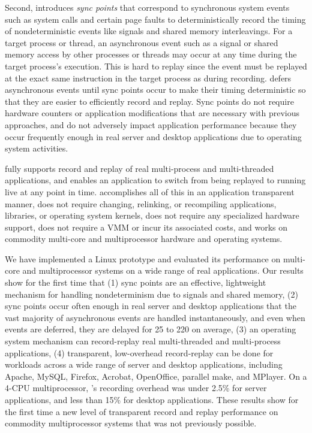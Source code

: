 Second, \scribe{} introduces {\em sync points} that correspond to
synchronous system events such as system calls and certain page faults 
to deterministically record the timing of nondeterministic events like
signals and shared memory interleavings.  For a target process or
thread, an asynchronous event such as a signal or shared memory access
by other processes or threads may occur at any time during the target
process's execution.  This is hard to replay since the event
must be replayed at the exact same instruction in the target process 
as during recording.  \scribe{} defers asynchronous events until sync
points occur to make their timing deterministic so that they are 
easier to efficiently record and replay.  Sync points do not require
hardware counters or application modifications that are necessary with
previous approaches, and do not adversely impact application
performance because they occur frequently enough in real server and
desktop applications due to operating system activities.   

\scribe{} fully supports record and replay of real multi-process
and multi-threaded applications, and  
enables an application to switch from being replayed to
running live at any point in time.
\scribe{} accomplishes all of this in an application transparent
manner, does not require changing, relinking, or recompiling
applications, libraries, or operating system kernels, does not require
any specialized hardware support, does not require a VMM or incur its
associated costs, and works on commodity multi-core and multiprocessor
hardware and operating systems.

We have implemented a \scribe{} Linux prototype and evaluated its
performance on multi-core and multiprocessor systems on a wide
range of real applications.  Our results show for the first time that
(1) sync points are an effective, lightweight mechanism for handling
nondeterminism due to signals and shared memory, (2) sync points occur
often enough in real server and desktop applications that the vast
majority of asynchronous events are handled instantaneously, and even
when events are deferred, they are delayed for 25 to 220\us{} on
average, (3) an operating system mechanism can record-replay real
multi-threaded and multi-process applications, (4) transparent,
low-overhead record-replay
can be done for workloads across a wide range of server and
desktop applications, including Apache, MySQL, Firefox, Acrobat,
OpenOffice, parallel make, and MPlayer.  On a 4-CPU multiprocessor,
\scribe{}'s recording overhead was under 2.5\% for server
applications, and less than 15\% for desktop applications.  These
results show for the first time a new level of transparent record and
replay performance on commodity multiprocessor systems that was not
previously possible. 

